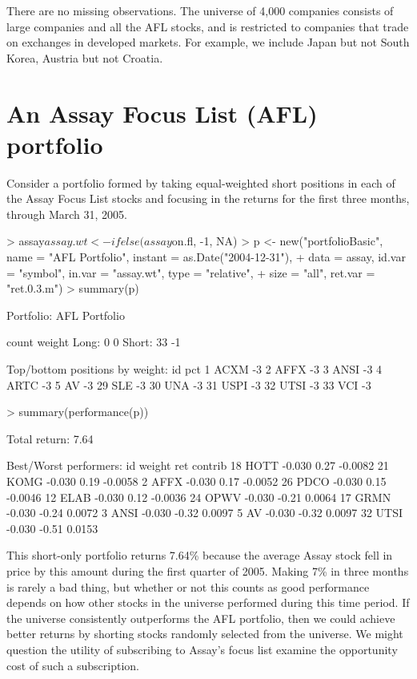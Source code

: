 \documentclass{article}
\begin{document}
There are no missing observations. The universe of 4,000 companies
consists of large companies and all the AFL stocks, and is restricted
to companies that trade on exchanges in developed markets. For
example, we include Japan but not South Korea, Austria but not
Croatia.

\section{An Assay Focus List (AFL) portfolio}

Consider a portfolio formed by taking equal-weighted short positions
in each of the Assay Focus List stocks and focusing in the returns for the
first three months, through March 31, 2005.

\begin{Schunk}
\begin{Sinput}
> assay$assay.wt <- ifelse(assay$on.fl, -1, NA)
> p <- new("portfolioBasic", name = "AFL Portfolio", instant = as.Date("2004-12-31"), 
+     data = assay, id.var = "symbol", in.var = "assay.wt", type = "relative", 
+     size = "all", ret.var = "ret.0.3.m")
> summary(p)
\end{Sinput}
\begin{Soutput}
Portfolio: AFL Portfolio

        count       weight
Long:       0            0 
Short:     33           -1 

Top/bottom positions by weight:
     id pct
1  ACXM  -3
2  AFFX  -3
3  ANSI  -3
4  ARTC  -3
5    AV  -3
29  SLE  -3
30  UNA  -3
31 USPI  -3
32 UTSI  -3
33  VCI  -3
\end{Soutput}
\begin{Sinput}
> summary(performance(p))
\end{Sinput}
\begin{Soutput}
Total return:  7.64 % 

Best/Worst performers:
     id weight   ret contrib
18 HOTT -0.030  0.27 -0.0082
21 KOMG -0.030  0.19 -0.0058
2  AFFX -0.030  0.17 -0.0052
26 PDCO -0.030  0.15 -0.0046
12 ELAB -0.030  0.12 -0.0036
24 OPWV -0.030 -0.21  0.0064
17 GRMN -0.030 -0.24  0.0072
3  ANSI -0.030 -0.32  0.0097
5    AV -0.030 -0.32  0.0097
32 UTSI -0.030 -0.51  0.0153
\end{Soutput}
\end{Schunk}

This short-only portfolio returns 7.64\% because the average Assay
stock fell in price by this amount during the first quarter of 2005.
Making 7\% in three months is rarely a bad thing, but whether or not
this counts as good performance depends on how other stocks in the
universe performed during this time period.  If the universe
consistently outperforms the AFL portfolio, then we could achieve
better returns by shorting stocks randomly selected from the universe.
We might question the utility of subscribing to Assay's focus list
examine the opportunity cost of such a subscription.
\end{document}
